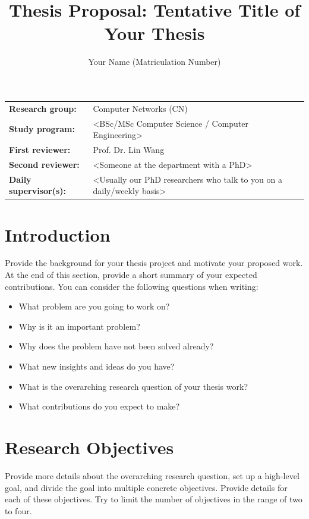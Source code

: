 \documentclass[report]{template-core/upb-cn}
\title{Thesis Proposal: Tentative Title of Your Thesis}
\author{Your Name (Matriculation Number)}
\begin{document}
\makethetitle

\begin{notebox}
    \begin{tabular}{@{}ll}
        \textbf{Research group:} & Computer Networks (CN) \\
        \textbf{Study program:} & <BSc/MSc Computer Science / Computer Engineering> \\
        \textbf{First reviewer:} & Prof. Dr. Lin Wang \\
        \textbf{Second reviewer:} & <Someone at the department with a PhD> \\
        \textbf{Daily supervisor(s):} & <Usually our PhD researchers who talk to you on a daily/weekly basis>
    \end{tabular}
\end{notebox}

\section{Introduction}
\label{sec:introduction}

Provide the background for your thesis project and motivate your proposed work. At the end of this section, provide a short summary of your expected contributions. You can consider the following questions when writing:

\begin{itemize}
    \item What problem are you going to work on?
    \item Why is it an important problem?
    \item Why does the problem have not been solved already?
    \item What new insights and ideas do you have?
    \item What is the overarching research question of your thesis work?
    \item What contributions do you expect to make? 
\end{itemize}

\section{Research Objectives}
\label{sec:objectives}

Provide more details about the overarching research question, set up a high-level goal, and divide the goal into multiple concrete objectives. Provide details for each of these objectives. Try to limit the number of objectives in the range of two to four. 
\end{document}
